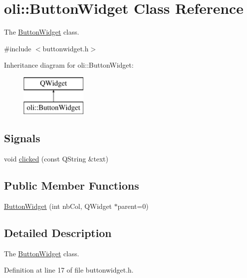 \hypertarget{classoli_1_1_button_widget}{}\section{oli\+:\+:Button\+Widget Class Reference}
\label{classoli_1_1_button_widget}


The \hyperlink{classoli_1_1_button_widget}{Button\+Widget} class.  




{\ttfamily \#include $<$buttonwidget.\+h$>$}

Inheritance diagram for oli\+:\+:Button\+Widget\+:\begin{figure}[H]
\begin{center}
\leavevmode
\includegraphics[height=2.000000cm]{classoli_1_1_button_widget}
\end{center}
\end{figure}
\subsection*{Signals}
\begin{DoxyCompactItemize}
\item 
void \hyperlink{classoli_1_1_button_widget_aff1ad492bde8150e865090bf98fd4c68}{clicked} (const Q\+String \&text)
\end{DoxyCompactItemize}
\subsection*{Public Member Functions}
\begin{DoxyCompactItemize}
\item 
\hyperlink{classoli_1_1_button_widget_af555496df54a4444217570f7ee49d582}{Button\+Widget} (int nb\+Col, Q\+Widget $\ast$parent=0)
\end{DoxyCompactItemize}


\subsection{Detailed Description}
The \hyperlink{classoli_1_1_button_widget}{Button\+Widget} class. 

Definition at line 17 of file buttonwidget.\+h.



